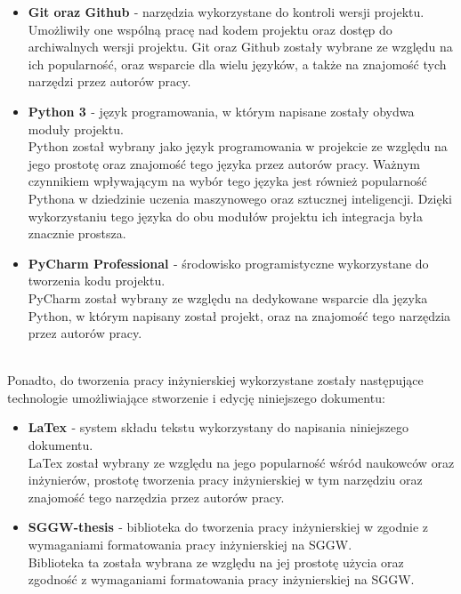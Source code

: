 \begin{itemize}
    \item \textbf{Git \cite{chacon2014pro} oraz Github \cite{GitHub}} -
    narzędzia
    wykorzystane do kontroli
    wersji projektu.\\ Umożliwiły one wspólną pracę nad kodem projektu oraz
    dostęp do archiwalnych wersji projektu. Git oraz Github zostały wybrane
    ze względu na ich popularność, oraz wsparcie dla wielu języków, a także
    na znajomość tych narzędzi przez autorów pracy.
    \item \textbf{Python 3 \cite{python3docs}} - język programowania, w
    którym napisane
    zostały obydwa moduły projektu.\\ Python został wybrany jako język
    programowania w projekcie ze względu na jego prostotę oraz
    znajomość tego języka przez autorów pracy. Ważnym czynnikiem wpływającym
    na wybór tego języka jest również popularność Pythona w dziedzinie
    uczenia maszynowego oraz sztucznej inteligencji. Dzięki wykorzystaniu
    tego języka do obu modułów projektu ich integracja była znacznie prostsza.
    \item \textbf{PyCharm Professional \cite{pycharm}}  - środowisko
    programistyczne
    wykorzystane do tworzenia kodu projektu.\\PyCharm został wybrany ze
    względu na dedykowane wsparcie dla języka Python, w którym napisany
    został projekt, oraz na znajomość tego narzędzia przez autorów pracy.
\end{itemize}

\\Ponadto, do tworzenia pracy inżynierskiej wykorzystane zostały następujące
technologie umożliwiające stworzenie i edycję niniejszego dokumentu:

\begin{itemize}
    \item \textbf{LaTex \cite{mittelbach2004latex}} - system składu tekstu
    wykorzystany do napisania
    niniejszego dokumentu.\\ LaTex został wybrany ze względu na jego
    popularność wśród naukowców oraz inżynierów, prostotę tworzenia pracy
    inżynierskiej w tym narzędziu oraz znajomość tego narzędzia przez autorów pracy.
    \item \textbf{SGGW-thesis \cite{chmiel2024sggwthesislatex}} - biblioteka
    do tworzenia pracy
    inżynierskiej
    w \latex zgodnie z wymaganiami formatowania pracy inżynierskiej na SGGW.\\ Biblioteka ta została wybrana ze względu na jej prostotę użycia oraz zgodność z wymaganiami formatowania pracy inżynierskiej na SGGW.
\end{itemize}

